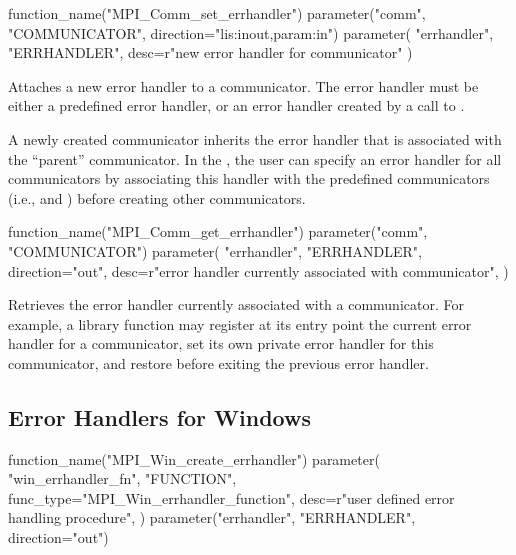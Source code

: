%
\begin{mpi-binding}
    function_name("MPI_Comm_set_errhandler")
    parameter("comm", "COMMUNICATOR", direction="lis:inout,param:in")
    parameter(
        "errhandler", "ERRHANDLER", desc=r"new error handler for communicator"
    )
\end{mpi-binding}

Attaches a new error handler to a communicator.
The error handler must be either a predefined error
handler, or an error handler created by a call to
.  

\begin{users}
A newly
created communicator inherits the error
handler that is associated with the ``parent'' communicator.
In the \wpm{}, the user can specify an error handler for
all communicators by
associating this handler with the predefined communicators (i.e.,  and )
before creating other communicators.
\end{users}

%
\begin{mpi-binding}
    function_name("MPI_Comm_get_errhandler")
    parameter("comm", "COMMUNICATOR")
    parameter(
        "errhandler",
        "ERRHANDLER",
        direction="out",
        desc=r"error handler currently associated with communicator",
    )
\end{mpi-binding}

Retrieves the error handler currently associated with a communicator.
%
For example, a
library function may register at its entry point the current error
handler for a
communicator, set its own private error handler for this communicator, and
restore before exiting the previous error handler.


\subsection{Error Handlers for Windows}
\label{subsec:inquiry-errhdlr-windows}

%
\begin{mpi-binding}
    function_name("MPI_Win_create_errhandler")
    parameter(
        "win_errhandler_fn",
        "FUNCTION",
        func_type="MPI_Win_errhandler_function",
        desc=r"user defined error handling procedure",
    )
    parameter("errhandler", "ERRHANDLER", direction="out")
\end{mpi-binding}

